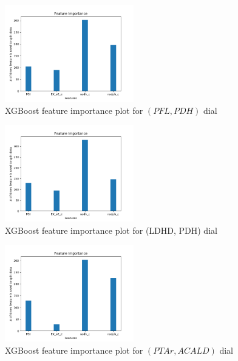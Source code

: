 \documentclass[12pt,chapterheads]{ucsd}
\begin{document}
\begin{figure}[h] 
\centering
\includegraphics[width=0.5\textwidth]{Figures/PFL_PDH_xgboost_no_params_important_features}
\caption[XGBoost feature importance plot for $(PFL, PDH)$ dial]
{XGBoost feature importance plot for $(PFL, PDH)$ dial}
\label{fig:PflPdhXgbImp}
\end{figure}

\begin{figure}[h] 
\centering
\includegraphics[width=0.5\textwidth]{Figures/LDH_D_PDH_xgboost_no_params_important_features}
\caption[XGBoost feature importance plot for \string(LDH\textunderscore D, PDH) dial]
{XGBoost feature importance plot for \string(LDH\textunderscore D, PDH) dial}
\label{fig:LdhPdhXgbImp}
\end{figure}

\begin{figure}[h] 
\centering
\includegraphics[width=0.5\textwidth]{Figures/PTAr_ACALD_xgboost_no_params_important_features}
\caption[XGBoost feature importance plot for $(PTAr, ACALD)$ dial]
{XGBoost feature importance plot for $(PTAr, ACALD)$ dial}
\label{fig:PtarAcaldXgbImp}
\end{figure}
\end{document}
